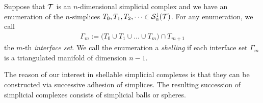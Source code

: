 \documentclass[10pt,a4paper]{article}
\newcommand{\mwl}[1]{{\color{red}#1}}
\begin{document}



Suppose that ${\mathcal T}$ is an $n$-dimensional simplicial complex and we have an enumeration of the $n$-simplices $T_{0}, T_{1}, T_{2}, \dots \in {\mathcal S}^{\downarrow}_{n}({\mathcal T})$.
For any enumeration, we call 
\begin{align*}
    \Gamma_m 
    := 
    \big( 
        T_{0} \cup T_{1} \cup \dots \cup T_{m} 
    \big) 
    \cap 
    T_{m+1}
\end{align*}
the $m$-th \textit{interface set}. 
We call the enumeration a \emph{shelling} if each interface set $\Gamma_m$ is a triangulated manifold of dimension $n-1$. 

The reason of our interest in shellable simplicial complexes is that they can be constructed via successive adhesion of simplices.
The resulting succession of simplicial complexes consists of simplicial balls or spheres. 
\end{document}
